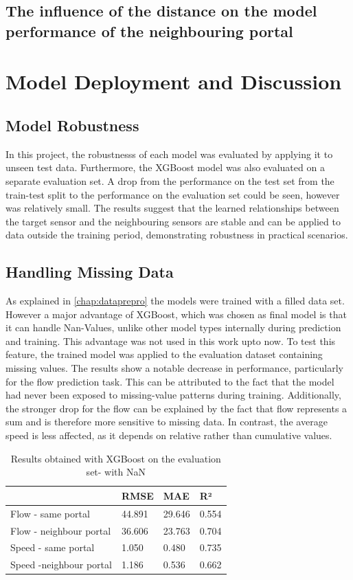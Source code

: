 	\subsection{The influence of the distance on the model performance of the neighbouring portal}
	
	\section{Model Deployment and Discussion}
	\subsection{Model Robustness }
	In this project, the robustnesss of each model was evaluated by applying it to unseen test data.  Furthermore, the XGBoost model was also evaluated on a separate evaluation set.
	A drop from the performance on the test set from the train-test split to the performance on the evaluation set could be seen, however was relatively small. The results suggest that the learned relationships between the target sensor and the neighbouring sensors are stable and can be applied to data outside the training period, demonstrating robustness in practical scenarios.
	\subsection{Handling Missing  Data}
	As explained in \ref{chap:dataprepro} the models were trained with a filled data set. 
	However a major advantage of XGBoost, which was chosen as final model is that it can handle Nan-Values, unlike other model types internally during prediction and training. This advantage was not used in this work upto now.
	To test this feature, the trained model was applied to the evaluation dataset containing missing values. The results show a notable decrease in performance, particularly for the flow prediction task. This can be attributed to the fact that the model had never been exposed to missing-value patterns during training. Additionally, the stronger drop for the flow can be explained by the fact that flow represents a sum and is therefore more sensitive to missing data. In contrast, the average speed is less affected, as it depends on relative rather than cumulative values.
	\begin{table}[H]
		\centering
		\caption{Results obtained with XGBoost on the evaluation set- with NaN}
		\label{tab:result_xgb_evaluation_wnan}
		\begin{tabular}{l|lll}
			& RMSE   & MAE    & R²    \\
			\hline
			Flow - same portal      & 44.891 &29.646 &0.554\\
			Flow - neighbour portal & 36.606 &23.763 & 0.704 \\
			Speed - same portal     &1.050 & 0.480 & 0.735\\
			Speed -neighbour portal &  1.186& 0.536 & 0.662
		\end{tabular}
	\end{table}
